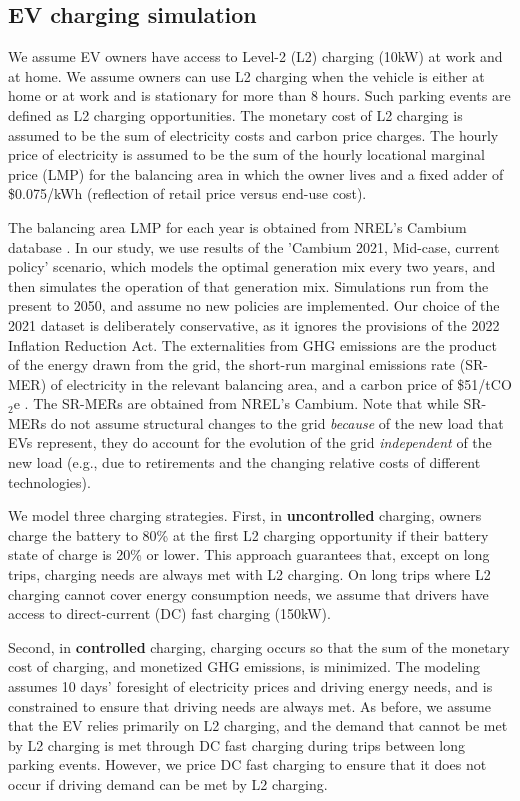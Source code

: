 \documentclass[11pt,preprint]{elsarticle}
\begin{document}
\subsection{EV charging simulation}\label{sec:chargingsim}
We assume EV owners have access to Level-2 (L2) charging (10kW) at work and at home. We assume owners can use L2 charging when the vehicle is either at home or at work and is stationary for more than 8 hours. Such parking events are defined as L2 charging opportunities. The monetary cost of L2 charging is assumed to be the sum of electricity costs and carbon price charges. The hourly price of electricity is assumed to be the sum of the hourly locational marginal price (LMP) for the balancing area in which the owner lives and a fixed adder of \$0.075/kWh (reflection of retail price versus end-use cost)\cite{gagnon_cambium_2021}. 

The balancing area LMP for each year is obtained from NREL's Cambium database \cite{gagnon_cambium_2021}. In our study, we use results of the 'Cambium 2021, Mid-case, current policy' scenario, which models the optimal generation mix every two years, and then simulates the operation of that generation mix. Simulations run from the present to 2050, and assume no new policies are implemented. Our choice of the 2021 dataset is deliberately conservative, as it ignores the provisions of the 2022 Inflation Reduction Act. The externalities from GHG emissions are the product of the energy drawn from the grid, the short-run marginal emissions rate (SR-MER) of electricity in the relevant balancing area, and a carbon price of \$51/tCO$_2$e \cite{noauthor_technical_2021}. The SR-MERs are obtained from NREL's Cambium. Note that while SR-MERs do not assume structural changes to the grid \textit{because} of the new load that EVs represent, they do account for the evolution of the grid \textit{independent} of the new load (e.g., due to retirements and the changing relative costs of different technologies).

We model three charging strategies. First, in \textbf{uncontrolled} charging, owners charge the battery to 80\% at the first L2 charging opportunity if their battery state of charge is 20\% or lower. This approach guarantees that, except on long trips, charging needs are always met with L2 charging. On long trips where L2 charging cannot cover energy consumption needs, we assume that drivers have access to direct-current (DC) fast charging (150kW). 

Second, in \textbf{controlled} charging, charging occurs so that the sum of the monetary cost of charging, and monetized GHG emissions, is minimized. The modeling assumes 10 days' foresight of electricity prices and driving energy needs, and is constrained to ensure that driving needs are always met. As before, we assume that the EV relies primarily on L2 charging, and the demand that cannot be met by L2 charging is met through DC fast charging during trips between long parking events. However, we price DC fast charging to ensure that it does not occur if driving demand can be met by L2 charging. 
\end{document}
